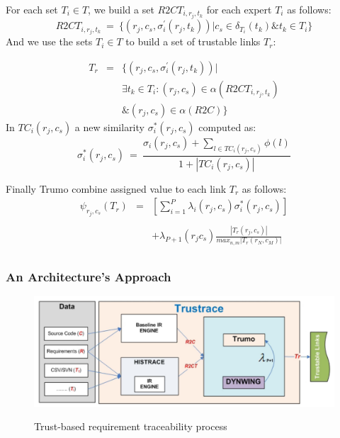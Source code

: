 \documentclass[12pt,hyperref=true,mathserif]{beamer}
\begin{document}
\begin{frame}
For each set $T_{i}\in T$, we build a set $R2CT_{i,r_{j},t_{k}}$ for each expert $T_{i}$ as follows:
\begin{equation}
\label{equ:RequirementSetforExperts}
  R2CT_{i,r_{j},t_{k}}~=~\{(r_{j},c_{s},\sigma^{'}_{i}(r_{j},t_{k}))|c_{s}\in \delta_{T_{i}}(t_{k}) \& t_{k}\in T_{i}\}
\end{equation}
And we use the sets $T_{i} \in T$ to build a set of trustable links $T_{r}$:

\begin{equation}
    \begin{array}{rcl}
        T_{r} & = & \{(r_{j},c_{s},\sigma^{'}_{i}(r_{j},t_{k}))|\\
                  &  & \exists t_{k} \in T_{i}:(r_{j},c_{s})\in \alpha(R2CT_{i,r_{j},t_{k}})\\
                  &  & \&(r_{j},c_{s}) \in \alpha(R2C)\}
    \end{array}
\end{equation}
In $TC_{i}(r_{j},c_{s})$ a new similarity $\sigma^{*}_{i}(r_{j},c_{s})$ computed as:
\begin{equation}
\label{equ:TrumoNewSimilarity}
  \sigma^{*}_{i}(r_{j},c_{s})~=~\frac{\sigma_{i}(r_{j},c_{s})+\sum_{l\in TC_{i}(r_{j},c_{s})}\phi(l)}{1+|TC_{i}(r_{j},c_{s})|}
\end{equation}
\end{frame}

\begin{frame}
Finally Trumo combine assigned value  to each link $T_{r}$ as follows:
\begin{equation}
    \begin{array}{rcl}
        \psi_{r_{j},c_{s}}(T_{r}) & = & [\sum_{i=1}^{P}\lambda_{i}(r_{j},c_{s})\sigma^{*}_{i}(r_{j},c_{s})]\\
        &  &  \\
                  &  & +\lambda_{P+1}(r_{j}c_{s}) \frac{|T_{r}(r_{j},c_{s})|}{max_{n,m}|T_{r}(r_{N},c_{M})|}\\

    \end{array}
\end{equation}
\end{frame}

\begin{frame}
\frametitle{An Architecture's Approach}
\begin{figure}
  \centering
  \includegraphics[scale=0.2]{Traceability}\\
  \caption{Trust-based requirement traceability process}\label{fig:Traceability}
\end{figure}
\end{frame}
\end{document}
